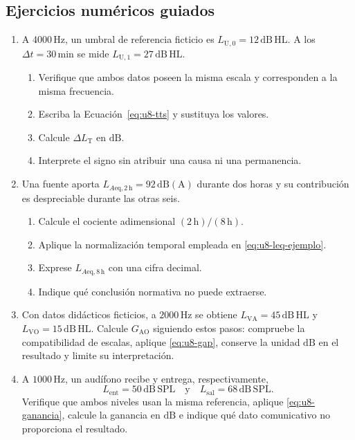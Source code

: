 \subsection*{Ejercicios numéricos guiados}

\begin{enumerate}[label=\textbf{NG\arabic*.},leftmargin=*]
    \item A \(4000\,\mathrm{Hz}\), un umbral de referencia ficticio es
    \(L_{\mathrm{U},0}=12\,\mathrm{dB\,HL}\). A los
    \(\Delta t=30\,\mathrm{min}\) se mide
    \(L_{\mathrm{U},1}=27\,\mathrm{dB\,HL}\).
    \begin{enumerate}
        \item Verifique que ambos datos poseen la misma escala y corresponden a
        la misma frecuencia.
        \item Escriba la Ecuación~\eqref{eq:u8-tts} y sustituya los valores.
        \item Calcule \(\Delta L_{\mathrm{T}}\) en \(\mathrm{dB}\).
        \item Interprete el signo sin atribuir una causa ni una permanencia.
    \end{enumerate}

    \item Una fuente aporta \(L_{A\mathrm{eq},2\,\mathrm{h}}=92\,\mathrm{dB(A)}\)
    durante dos horas y su contribución es despreciable durante las otras seis.
    \begin{enumerate}
        \item Calcule el cociente adimensional
        \((2\,\mathrm{h})/(8\,\mathrm{h})\).
        \item Aplique la normalización temporal empleada en
        \eqref{eq:u8-leq-ejemplo}.
        \item Exprese \(L_{A\mathrm{eq},8\,\mathrm{h}}\) con una cifra decimal.
        \item Indique qué conclusión normativa no puede extraerse.
    \end{enumerate}

    \item Con datos didácticos ficticios, a \(2000\,\mathrm{Hz}\) se obtiene
    \(L_{\mathrm{VA}}=45\,\mathrm{dB\,HL}\) y
    \(L_{\mathrm{VO}}=15\,\mathrm{dB\,HL}\). Calcule
    \(G_{\mathrm{AO}}\) siguiendo estos pasos: compruebe la compatibilidad de
    escalas, aplique \eqref{eq:u8-gap}, conserve la unidad
    \(\mathrm{dB}\) en el resultado y limite su interpretación.

    \item A \(1000\,\mathrm{Hz}\), un audífono recibe y entrega,
    respectivamente,
    \[
        L_{\mathrm{ent}}=50\,\mathrm{dB\,SPL}
        \quad\text{y}\quad
        L_{\mathrm{sal}}=68\,\mathrm{dB\,SPL}.
    \]
    Verifique que ambos niveles usan la misma referencia, aplique
    \eqref{eq:u8-ganancia}, calcule la ganancia en \(\mathrm{dB}\) e indique
    qué dato comunicativo no proporciona el resultado.
\end{enumerate}

